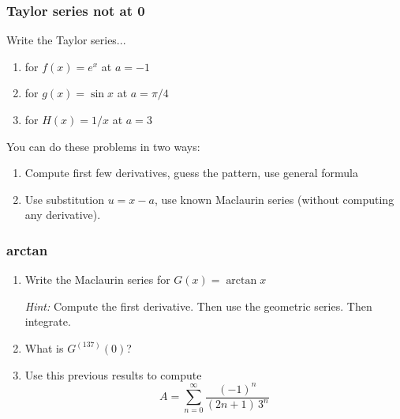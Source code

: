 \documentclass[14pt]{beamer}
\begin{document}
\begin{frame}[t]
	\frametitle{Taylor series not at 0}

	Write the Taylor series...
	\begin{enumerate}
		\item for \; $\displaystyle f(x) = e^{x}$ \; at \; $a=-1$

		\item for \; $\displaystyle g(x) = \sin x$ \; at \; $\displaystyle a = \pi/4$

		\item for \; $\displaystyle H(x) = 1/x$ \; at \; $\displaystyle a = 3$
	\end{enumerate}

	You can do these problems in two ways:
	\begin{enumerate}
		\item Compute first few derivatives, guess the pattern, use general formula

		\item Use substitution $\displaystyle u = x - a$, use known Maclaurin series
			(without computing any derivative).
	\end{enumerate}
\end{frame}

\begin{frame}[t]
	\frametitle{arctan}

	\begin{enumerate}
		\item Write the Maclaurin series for \; $\displaystyle G(x) = \arctan x$
			\vspace{.2cm}

			\emph{Hint:} Compute the first derivative. Then use the geometric series. Then
			integrate.
			\vspace{.2cm}


		\item What is $\displaystyle G^{(137)}(0)$?
			\vspace{.2cm}


		\item Use this previous results to compute
			\[
				A = \sum_{n=0}^{\infty}\frac{(-1)^{n}}{(2n+1) \, 3^{n}}
			\]
	\end{enumerate}
\end{frame}
\end{document}
